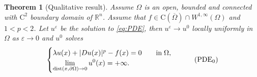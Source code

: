 \documentclass[11pt,reqno]{amsart}
\numberwithin{figure}{section}
\theoremstyle{plain}
\newtheorem{thm}{Theorem}[section]
\theoremstyle{remark}
\numberwithin{equation}{section}
\begin{document}
\begin{thm}[Qualitative result] Assume $\Omega$ is an open, bounded and connected with $\mathrm{C}^2$ boundary domain of $\mathbb{R}^n$. Assume that $f\in \mathrm{C}(\overline{\Omega})\cap W^{1,\infty}(\Omega)$ and $1<p<2$. Let $u^\varepsilon$ be the solution to \eqref{eq:PDE}, then $u^\varepsilon \rightarrow u^0$ locally uniformly in $\Omega$ as $\varepsilon\rightarrow 0$ and $u^0$ solves
\begin{equation}\label{eq:PDE0}
    \begin{cases}
    \lambda u(x) + |Du(x)|^p - f(x)=  0 \qquad\text{in}\;\Omega, \vspace{0cm}\\
    \displaystyle  \lim_{\mathrm{dist}(x,\partial \Omega)\to 0} u^0(x) = +\infty.
    \end{cases} \tag{PDE$_0$}
\end{equation}
\end{thm}
\end{document}
